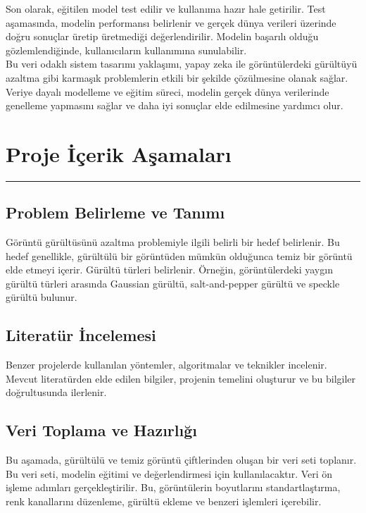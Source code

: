 \documentclass{article}
\begin{document}
 \noindent Son olarak, eğitilen model test edilir ve kullanıma hazır hale getirilir. Test aşamasında, modelin performansı belirlenir ve gerçek dünya verileri üzerinde doğru sonuçlar üretip üretmediği değerlendirilir. Modelin başarılı olduğu gözlemlendiğinde, kullanıcıların kullanımına sunulabilir.\\[10pt]

 \noindent Bu veri odaklı sistem tasarımı yaklaşımı, yapay zeka ile görüntülerdeki gürültüyü azaltma gibi karmaşık problemlerin etkili bir şekilde çözülmesine olanak sağlar. Veriye dayalı modelleme ve eğitim süreci, modelin gerçek dünya verilerinde genelleme yapmasını sağlar ve daha iyi sonuçlar elde edilmesine yardımcı olur.\\[10pt]


\section{Proje İçerik   Aşamaları}
\rule{\textwidth}{0.5pt}

\subsection{Problem Belirleme ve Tanımı}
Görüntü gürültüsünü azaltma problemiyle ilgili belirli bir hedef belirlenir. Bu hedef genellikle, gürültülü bir görüntüden mümkün olduğunca temiz bir görüntü elde etmeyi içerir.
Gürültü türleri belirlenir. Örneğin, görüntülerdeki yaygın gürültü türleri arasında Gaussian gürültü, salt-and-pepper gürültü ve speckle gürültü bulunur.

\subsection{Literatür İncelemesi}
 Benzer projelerde kullanılan yöntemler, algoritmalar ve teknikler incelenir.
Mevcut literatürden elde edilen bilgiler, projenin temelini oluşturur ve bu bilgiler doğrultusunda ilerlenir.

\subsection{Veri Toplama ve Hazırlığı}
Bu aşamada, gürültülü ve temiz görüntü çiftlerinden oluşan bir veri seti toplanır. Bu veri seti, modelin eğitimi ve değerlendirmesi için kullanılacaktır.
Veri ön işleme adımları gerçekleştirilir. Bu, görüntülerin boyutlarını standartlaştırma, renk kanallarını düzenleme, gürültü ekleme ve benzeri işlemleri içerebilir.
\end{document}
